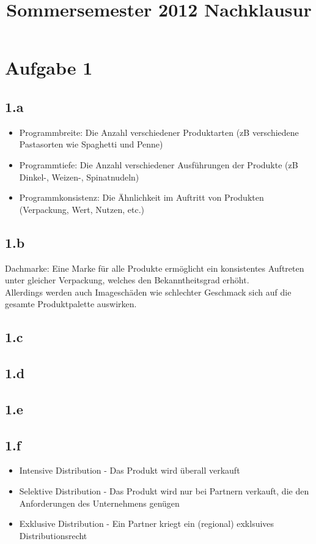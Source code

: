 

\title{Sommersemester 2012 Nachklausur}
\maketitle

\section*{Aufgabe 1}
\subsection*{1.a}
    \begin{itemize}
        \item Programmbreite: Die Anzahl verschiedener Produktarten (zB verschiedene Pastasorten wie Spaghetti und Penne)
        \item Programmtiefe: Die Anzahl verschiedener Ausführungen der Produkte (zB Dinkel-, Weizen-, Spinatnudeln)
        \item Programmkonsistenz: Die Ähnlichkeit im Auftritt von Produkten (Verpackung, Wert, Nutzen, etc.)
    \end{itemize}

\subsection*{1.b}
    Dachmarke: Eine Marke für alle Produkte ermöglicht ein konsistentes Auftreten unter gleicher Verpackung, welches den Bekanntheitsgrad erhöht. \\
    Allerdings werden auch Imageschäden wie schlechter Geschmack sich auf die gesamte Produktpalette auswirken.

\subsection*{1.c}
\subsection*{1.d}
\subsection*{1.e}
\subsection*{1.f}
    \begin{itemize}
        \item Intensive Distribution - Das Produkt wird überall verkauft
        \item Selektive Distribution - Das Produkt wird nur bei Partnern verkauft, die den Anforderungen des Unternehmens genügen
        \item Exklusive Distribution - Ein Partner kriegt ein (regional) exklsuives Distributionsrecht
    \end{itemize}


